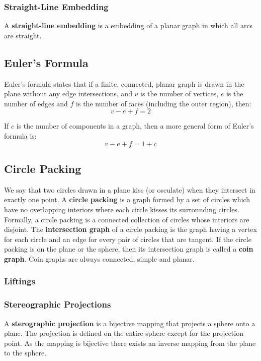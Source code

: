\documentclass{article}
\begin{document}
  \subsubsection{Straight-Line Embedding}
  A \textbf{straight-line embedding} is a embedding of a planar graph in which all arcs are straight.

 \subsection{Euler's Formula}
  Euler's formula states that if a finite, connected, planar graph is drawn in the plane without any edge intersections, and $v$ is the number of vertices, $e$ is the number of edges and $f$ is the number of faces (including the outer region), then: 
  \begin{equation} 
	v-e+f=2
  \end{equation}

  If $c$ is the number of components in a graph, then a more general form of Euler's formula is:
  \begin{equation} 
	v-e+f= 1 + c
  \end{equation}

 \subsection{Circle Packing}
  We say that two circles drawn in a plane kiss (or osculate) when they intersect in exactly one point. 
  A \textbf{circle packing} is a graph formed by a set of circles which have no overlapping interiors where each circle kisses its surrounding circles. 
  Formally, a circle packing is a connected collection of circles whose interiors are disjoint. 
  The \textbf{intersection graph} of a circle packing is the graph having a vertex for each circle and an edge for every pair of circles that are tangent. 
  If the circle packing is on the plane or the sphere, then its intersection graph is called a \textbf{coin graph}. 
  Coin graphs are always connected, simple and planar. 

  \subsubsection{Liftings}
  \subsubsection{Stereographic Projections}
  A \textbf{sterographic projection} is a bijective mapping that projects a sphere onto a plane.
  The projection is defined on the entire sphere except for the projection point. 
  As the mapping is bijective there exists an inverse mapping from the plane to the sphere.
\end{document}
